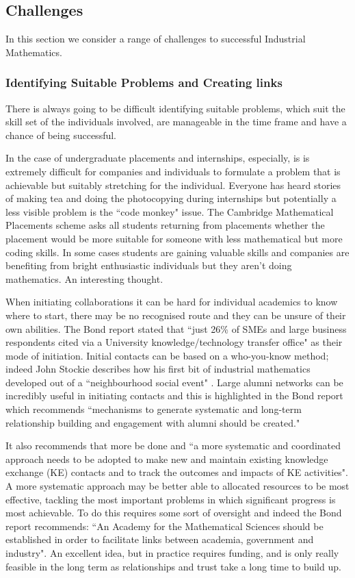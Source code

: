 \documentclass[11pt]{article} %
\begin{document}
	\subsection{Challenges \label{challenges}} 
	In this section we consider a range of challenges to successful Industrial Mathematics. 
	
	\subsubsection{Identifying Suitable Problems and Creating links} 
	
	There is always going to be difficult identifying suitable problems, which suit the skill set of the individuals involved, are manageable in the time frame and have a chance of being successful. 
	
	In the case of undergraduate placements and internships, especially,  is is extremely difficult for companies and individuals  to formulate a problem that is achievable but suitably stretching for the individual. Everyone has heard stories of making tea and doing the photocopying during internships but potentially a less visible problem is the ``code monkey" issue. The Cambridge Mathematical Placements scheme asks all students returning from placements whether the placement would be more suitable for someone with less mathematical but more coding skills. In some cases students are gaining valuable skills and companies are benefiting from bright enthusiastic individuals but they aren't doing mathematics. An interesting thought. 
	
	
	
	When initiating collaborations it can be hard for individual academics to know where to start, there may be  no recognised route and they can be  unsure of their own abilities.	The Bond report stated that ``just 26\% of SMEs and large business respondents cited via a University knowledge/technology transfer office" as their mode of initiation. Initial contacts can be based on a who-you-know  method; indeed John Stockie describes how his first bit of industrial mathematics developed out of a  ``neighbourhood social event" \cite{Stockie2015}. Large alumni networks can be incredibly useful in initiating contacts and this is highlighted in the Bond report \cite{Bond}  which recommends ``mechanisms to generate systematic and long-term relationship building and engagement with alumni should be created."
	
	It also recommends that more be done  and ``a more systematic and coordinated approach needs to be adopted to make new and maintain existing knowledge exchange (KE) contacts and to track the outcomes and impacts of KE activities". A more systematic approach may be better able to allocated resources to be most effective, tackling the most important problems in which significant progress is most achievable. To do this requires some sort of oversight and indeed the Bond report recommends: ``An Academy for the Mathematical Sciences should be established in order to facilitate links between academia, government and industry". An excellent idea, but in practice requires funding, and is only really feasible in the long term as relationships and trust take a long time to build up. 
	
\end{document}
